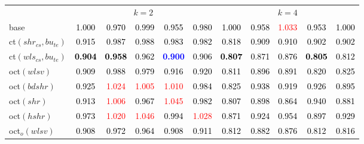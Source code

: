 \begin{tabular}[t]{l|>{}cccc>{}c|ccccc}
\multicolumn{1}{c}{} & \multicolumn{5}{c}{\textbf{$k = 2$}} & \multicolumn{5}{c}{\textbf{$k = 4$}}\\
base & \textcolor{black}{1.000} & \textcolor{black}{0.970} & \textcolor{black}{0.999} & \textcolor{black}{0.955} & \textcolor{black}{0.980} & \textcolor{black}{1.000} & \textcolor{black}{0.958} & \textcolor{red}{1.033} & \textcolor{black}{0.953} & \textcolor{black}{1.000}\\
ct$(shr_{cs}, bu_{te})$ & \textcolor{black}{0.915} & \textcolor{black}{0.987} & \textcolor{black}{0.988} & \textcolor{black}{0.983} & \textcolor{black}{0.982} & \textcolor{black}{0.818} & \textcolor{black}{0.909} & \textcolor{black}{0.910} & \textcolor{black}{0.902} & \textcolor{black}{0.902}\\
ct$(wls_{cs}, bu_{te})$ & \textcolor{black}{\textbf{0.904}} & \textcolor{black}{\textbf{0.958}} & \textcolor{black}{0.962} & \textcolor{blue}{\textbf{0.900}} & \textcolor{black}{0.906} & \textcolor{black}{\textbf{0.807}} & \textcolor{black}{0.871} & \textcolor{black}{0.876} & \textcolor{black}{\textbf{0.805}} & \textcolor{black}{0.812}\\
oct$(wlsv)$ & \textcolor{black}{0.909} & \textcolor{black}{0.988} & \textcolor{black}{0.979} & \textcolor{black}{0.916} & \textcolor{black}{0.920} & \textcolor{black}{0.811} & \textcolor{black}{0.896} & \textcolor{black}{0.891} & \textcolor{black}{0.820} & \textcolor{black}{0.825}\\
oct$(bdshr)$ & \textcolor{black}{0.925} & \textcolor{red}{1.024} & \textcolor{red}{1.005} & \textcolor{red}{1.010} & \textcolor{black}{0.984} & \textcolor{black}{0.825} & \textcolor{black}{0.938} & \textcolor{black}{0.919} & \textcolor{black}{0.926} & \textcolor{black}{0.895}\\
oct$(shr)$ & \textcolor{black}{0.913} & \textcolor{red}{1.006} & \textcolor{black}{0.967} & \textcolor{red}{1.045} & \textcolor{black}{0.982} & \textcolor{black}{0.807} & \textcolor{black}{0.898} & \textcolor{black}{0.864} & \textcolor{black}{0.940} & \textcolor{black}{0.881}\\
oct$(hshr)$ & \textcolor{black}{0.973} & \textcolor{red}{1.020} & \textcolor{red}{1.046} & \textcolor{black}{0.994} & \textcolor{red}{1.028} & \textcolor{black}{0.871} & \textcolor{black}{0.924} & \textcolor{black}{0.954} & \textcolor{black}{0.897} & \textcolor{black}{0.929}\\
oct$_o(wlsv)$ & \textcolor{black}{0.908} & \textcolor{black}{0.972} & \textcolor{black}{0.964} & \textcolor{black}{0.908} & \textcolor{black}{0.911} & \textcolor{black}{0.812} & \textcolor{black}{0.882} & \textcolor{black}{0.876} & \textcolor{black}{0.812} & \textcolor{black}{0.816}\\

\end{tabular}
